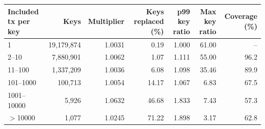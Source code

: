 \begin{tabular}{lrrrrrr}
\hline
Included tx per key & Keys & Multiplier & Keys replaced (\%) & p99 key ratio & Max key ratio & Coverage (\%)\\
\hline
1 & 19,179,874 & 1.0031 & 0.19 & 1.000 & 61.00 & --\\
2--10 & 7,880,901 & 1.0062 & 1.07 & 1.111 & 55.00 & 96.2\\
11--100 & 1,337,209 & 1.0036 & 6.08 & 1.098 & 35.46 & 89.9\\
101--1000 & 100,713 & 1.0054 & 14.17 & 1.067 & 6.83 & 67.5\\
1001--10000 & 5,926 & 1.0632 & 46.68 & 1.833 & 7.43 & 57.3\\
$>$10000 & 1,077 & 1.0245 & 71.22 & 1.898 & 3.17 & 62.8\\
\hline
\end{tabular}
